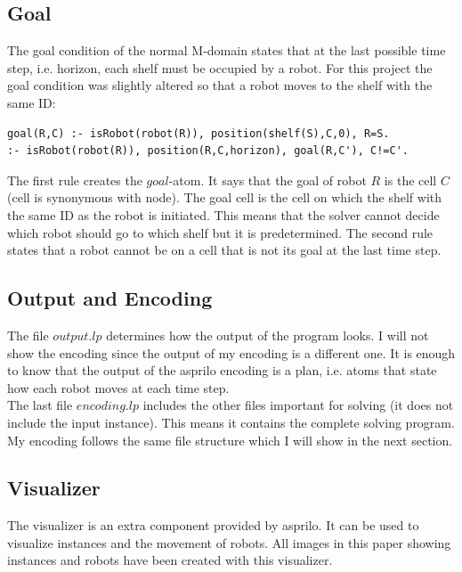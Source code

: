 \documentclass[runningheads]{llncs}
\begin{document}
\subsection{Goal}
The goal condition of the normal M-domain states that at the last possible time step, i.e. horizon, each shelf must be occupied by a robot. For this project the goal condition was slightly altered so that a robot moves to the shelf with the same ID:
\begin{verbatim}
goal(R,C) :- isRobot(robot(R)), position(shelf(S),C,0), R=S.
:- isRobot(robot(R)), position(R,C,horizon), goal(R,C'), C!=C'.
\end{verbatim}
The first rule creates the $goal$-atom. It says that the goal of robot $R$ is the cell $C$ (cell is synonymous with node). The goal cell is the cell on which the shelf with the same ID as the robot is initiated. This means that the solver cannot decide which robot should go to which shelf but it is predetermined. The second rule states that a robot cannot be on a cell that is not its goal at the last time step.
\subsection{Output and Encoding}
The file $output.lp$ determines how the output of the program looks. I will not show the encoding since the output of my encoding is a different one. It is enough to know that the output of the asprilo encoding is a plan, i.e. atoms that state how each robot moves at each time step. \\
The last file $encoding.lp$ includes the other files important for solving (it does not include the input instance). This means it contains the complete solving program. My encoding follows the same file structure which I will show in the next section.
\subsection{Visualizer}
The visualizer is an extra component provided by asprilo. It can be used to visualize instances and the movement of robots. All images in this paper showing instances and robots have been created with this visualizer.
\end{document}
